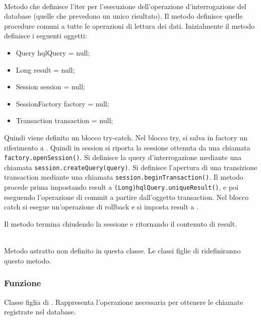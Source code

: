 \begin{description}
	\item{}\\
	Metodo che definisce l'iter per l'esecuzione dell'operazione d'interrogazione del database (quelle che prevedono un unico risultato). Il metodo definisce quelle procedure comuni a tutte le operazioni di lettura dei dati. Inizialmente il metodo definisce i seguenti oggetti:
	\begin{itemize}
		\item Query hqlQuery = null;
		\item Long result = null;
		\item Session session = null;
		\item SessionFactory factory = null;
		\item Transaction transaction = null;
	\end{itemize}
	
Quindi viene definito un blocco try-catch. Nel blocco try, si salva in factory un riferimento a . Quindi in session si riporta la sessione ottenuta da una chiamata \verb|factory.openSession()|. Si definisce la query d'interrogazione mediante una chiamata \verb|session.createQuery(query)|. Si definisce l'apertura di una transizione transaction mediante una chiamata \verb|session.beginTransaction()|. Il metodo procede prima impostando result a \verb|(Long)hqlQuery.uniqueResult()|, e poi eseguendo l'operazione di commit a partire dall'oggetto transaction. Nel blocco catch si esegue un'operazione di rollback e si imposta result a .

Il metodo termina chiudendo la sessione e ritornando il contenuto di result.

	\item{}\\
	Metodo astratto non definito in questa classe. Le classi figlie di  ridefiniranno questo metodo.

\end{description}


\subsubsection*{Funzione}
Classe figlia di . Rappresenta l'operazione necessaria per ottenere le chiamate registrate nel database.

